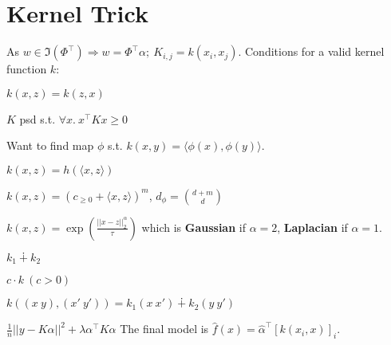 \section{Kernel Trick}
As \(w \in \Im(\Phi^\top) \Rightarrow w = \Phi^\top \alpha; \ K_{i, j} = k(x_i, x_j)\).
Conditions for a valid kernel function \(k\): \\
\begin{itemize*}
  \item \(k(x, z) = k(z, x)\)
  \item \(K\) psd s.t. \(\forall x. \ x^\top K x \geq 0 \) \\
\end{itemize*}
Want to find map \(\phi\) s.t. \(k(x, y) = \langle\phi(x), \phi(y)\rangle\).

\begin{definition}
  \(k(x, z) = h(\langle x, z \rangle)\)
\end{definition}

\begin{definition}
  \(k(x, z) = (c_{\geq 0} + \langle x, z \rangle)^m\), \(d_\phi = \binom{d + m}{d}\)
\end{definition}

\begin{definition}
  \(k(x, z)  = \exp\left(\frac{||x - z||_2^\alpha}{\tau}\right)\) which is \textbf{Gaussian} if \(\alpha = 2\), \textbf{Laplacian} if \(\alpha = 1\).
\end{definition}

\begin{definition}
  \begin{itemize*}
    \item \(k_1 \dotplus k_2\)
    \item \(c\cdot k \ (c >0)\)
    \item \(k((x \ y), (x' \ y')) = k_1(x \ x') \dotplus k_2(y \ y') \)
  \end{itemize*}
\end{definition}

\begin{definition}
  \(\frac{1}{n}||y - K\alpha||^2 + \lambda \alpha^\top K \alpha\)
  The final model is \(\hat{f}(x) = \hat{\alpha}^\top [k(x_i, x)]_i\).
\end{definition}